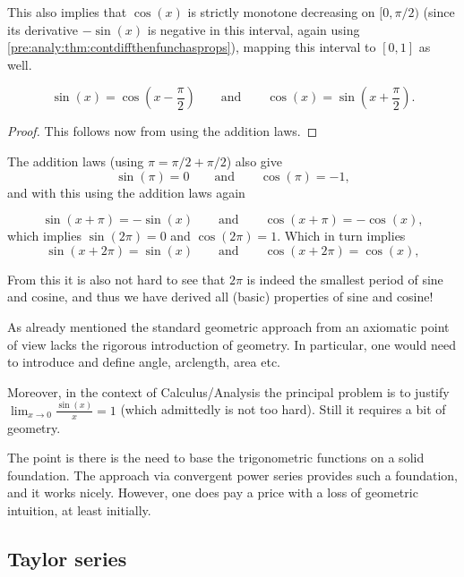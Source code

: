 \documentclass[10pt, a4paper]{article}
\begin{document}
This also implies that $\cos(x)$ is strictly monotone decreasing on $[0, \pi / 2)$
(since its derivative $-\sin(x)$ is negative in this interval,
again using \autoref{pre:analy:thm:contdiffthenfunchasprops}),
mapping this interval to $[0, 1]$ as well.

\begin{theorem}
    \[
    \sin(x) = \cos\left(x - \frac{\pi}{2}\right)\qquad\text{and}\qquad\cos(x) = \sin\left(x + \frac{\pi}{2}\right).
    \]
    \begin{proof}
        This follows now from using the addition laws.
    \end{proof}
\end{theorem}

The addition laws
(using $\pi = \pi / 2 + \pi / 2$)
also give
\[
\sin(\pi) = 0\qquad\text{and}\qquad\cos(\pi) = -1,
\]
and with this using the addition laws again
\begin{theorem}
    \[
    \sin(x + \pi) = -\sin(x)\qquad\text{and}\qquad\cos(x + \pi) = -\cos(x),
    \]
    which implies $\sin(2\pi) = 0$ and $\cos(2\pi) = 1$.
    Which in turn implies
    \[
    \sin(x + 2\pi) = \sin(x)\qquad\text{and}\qquad\cos(x + 2\pi) = \cos(x),
    \]
\end{theorem}
From this it is also not hard to see that $2\pi$ is indeed the smallest period of sine and cosine,
and thus we have derived all
(basic)
properties of sine and cosine!

\begin{remark}
    As already mentioned the standard geometric approach from an axiomatic point of view lacks the rigorous introduction of geometry.
    In particular,
    one would need to introduce and define angle,
    arclength,
    area etc.

    Moreover,
    in the context of Calculus/Analysis the principal problem is to justify $\lim_{x \rightarrow 0}\frac{\sin(x)}{x} = 1$
    (which admittedly is not too hard).
    Still it requires a bit of geometry.

    The point is there is the need to base the trigonometric functions on a solid foundation.
    The approach via convergent power series provides such a foundation,
    and it works nicely.
    However,
    one does pay a price with a loss of geometric intuition,
    at least initially.
\end{remark}

\subsection{Taylor series}
\end{document}
